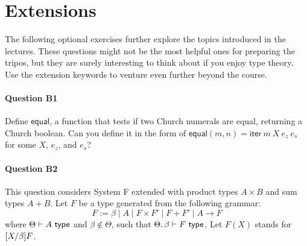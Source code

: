 \documentclass[11pt,a4paper,twoside]{article}
\begin{document}
\section*{Extensions}

The following optional exercises further explore the topics introduced in the lectures. These questions might not be the most helpful ones for preparing the tripos, but they are surely interesting to think about if you enjoy type theory. Use the extension keywords to venture even further beyond the course.

\paragraph{Question B1} Define $\mathsf{equal}$, a function that tests if two Church numerals are equal, returning a Church boolean. Can you define it in the form of $\mathsf{equal}(m, n) = \mathsf{iter}\ m\ X\ e_z\ e_s$ for some $X$, $e_z$, and $e_s$?




\paragraph{Question B2} This question considers System F extended with product types $A \times B$ and sum types $A + B$.
Let $F$ be a type generated from the following grammar:
  \[
    F := \beta \mid A \mid F \times F' \mid F + F' \mid A \to F
  \]
where $\Theta \vdash A\ \mathsf{type}$ and $\beta \notin \Theta$, 
such that $\Theta, \beta \vdash F\ \type$. 
Let $F(X)$ stands for $[X / \beta] F$.
\end{document}
